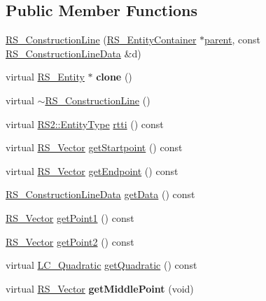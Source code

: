 \subsection*{Public Member Functions}
\begin{DoxyCompactItemize}
\item 
\hyperlink{classRS__ConstructionLine_a9567771e832afb69b944808a7816525f}{R\-S\-\_\-\-Construction\-Line} (\hyperlink{classRS__EntityContainer}{R\-S\-\_\-\-Entity\-Container} $\ast$\hyperlink{classRS__Entity_a80358a8d2fc6739a516a278dc500b49f}{parent}, const \hyperlink{classRS__ConstructionLineData}{R\-S\-\_\-\-Construction\-Line\-Data} \&d)
\item 
\hypertarget{classRS__ConstructionLine_aad0e0f069857385ee656f43d14a233b3}{virtual \hyperlink{classRS__Entity}{R\-S\-\_\-\-Entity} $\ast$ {\bfseries clone} ()}\label{classRS__ConstructionLine_aad0e0f069857385ee656f43d14a233b3}

\item 
virtual \hyperlink{classRS__ConstructionLine_a199a228cd20411e6abeffdb1d89379e1}{$\sim$\-R\-S\-\_\-\-Construction\-Line} ()
\item 
virtual \hyperlink{classRS2_a8f26d1b981e1e85cff16738b43337e6a}{R\-S2\-::\-Entity\-Type} \hyperlink{classRS__ConstructionLine_abd67924b88d9c1daa4432d42f90bb06b}{rtti} () const 
\item 
virtual \hyperlink{classRS__Vector}{R\-S\-\_\-\-Vector} \hyperlink{classRS__ConstructionLine_a43a9cab90975063683e955f96bcddfb2}{get\-Startpoint} () const 
\item 
virtual \hyperlink{classRS__Vector}{R\-S\-\_\-\-Vector} \hyperlink{classRS__ConstructionLine_aab074571db2a8f7f3acbec8f8b22e2ce}{get\-Endpoint} () const 
\item 
\hyperlink{classRS__ConstructionLineData}{R\-S\-\_\-\-Construction\-Line\-Data} \hyperlink{classRS__ConstructionLine_a196cf84d670b3b629a7e6be683525c22}{get\-Data} () const 
\item 
\hyperlink{classRS__Vector}{R\-S\-\_\-\-Vector} \hyperlink{classRS__ConstructionLine_aa9218f327948bedecce1181283315655}{get\-Point1} () const 
\item 
\hyperlink{classRS__Vector}{R\-S\-\_\-\-Vector} \hyperlink{classRS__ConstructionLine_a543d4fd3739cdb6f41366ca0a8c554fe}{get\-Point2} () const 
\item 
virtual \hyperlink{classLC__Quadratic}{L\-C\-\_\-\-Quadratic} \hyperlink{classRS__ConstructionLine_a132cedc3c59032c54a658a055c0bb43d}{get\-Quadratic} () const 
\item 
\hypertarget{classRS__ConstructionLine_ad673616f34e3a254417c6c99e85c8c7e}{virtual \hyperlink{classRS__Vector}{R\-S\-\_\-\-Vector} {\bfseries get\-Middle\-Point} (void)}\label{classRS__ConstructionLine_ad673616f34e3a254417c6c99e85c8c7e}


\end{DoxyCompactItemize}
